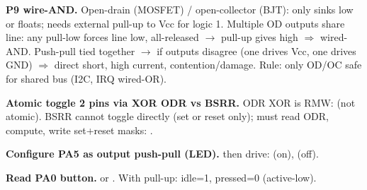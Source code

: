 \begin{hwp}\textbf{P9 wire-AND.} Open-drain (MOSFET) / open-collector (BJT): only sinks low or floats; needs external pull-up to Vcc for logic 1. Multiple OD outputs share line: any pull-low forces line low, all-released $\to$ pull-up gives high $\Rightarrow$ wired-AND. Push-pull tied together $\to$ if outputs disagree (one drives Vcc, one drives GND) $\Rightarrow$ direct short, high current, contention/damage. Rule: only OD/OC safe for shared bus (I2C, IRQ wired-OR).\end{hwp}

\begin{ex}\textbf{Atomic toggle 2 pins via XOR ODR vs BSRR.} ODR XOR is RMW:  (not atomic). BSRR cannot toggle directly (set or reset only); must read ODR, compute, write set+reset masks: .\end{ex}

\begin{ex}\textbf{Configure PA5 as output push-pull (LED).}  then drive:  (on),  (off).\end{ex}

\begin{ex}\textbf{Read PA0 button.}  or . With pull-up: idle=1, pressed=0 (active-low).\end{ex}

